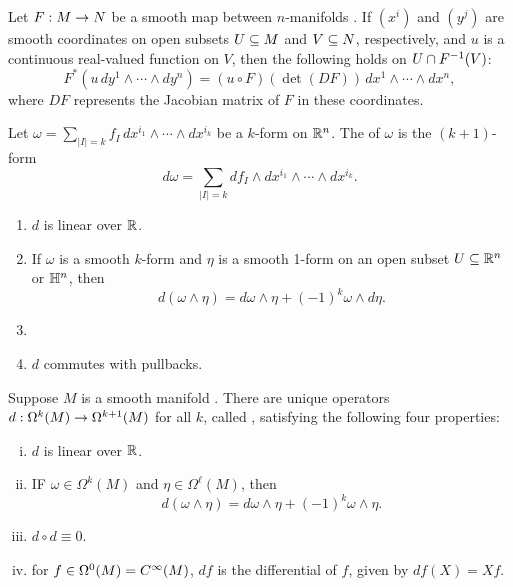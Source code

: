 \setcounter{thm}{19}

\begin{prop}
Let $F:M\rightarrow N$ be a smooth map between $n$-manifolds \wowob. If $(x^i)$ and $(y^j)$ are smooth coordinates on open subsets $U\subseteq M$ and $V\subseteq N$, respectively, and $u$ is a continuous real-valued function on $V$, then the following holds on $U\cap F^{-1}(V)$:
\[F^*(u\,dy^1\wedge\cdots\wedge dy^n) =(u\circ F)(\det(DF))\,dx^1\wedge\cdots\wedge dx^n,\]
where $DF$ represents the Jacobian matrix of $F$ in these coordinates.
\end{prop}

\dfn Let $\omega = \sum_{|I| = k} f_I\, dx^{i_1}\wedge\cdots\wedge dx^{i_k}$ be a $k$-form on $\mathbb{R}^n$. The  of $\omega$ is the $(k + 1)$-form
\[d\omega = \sum_{|I| = k} df_I\wedge dx^{i_1}\wedge\cdots\wedge dx^{i_k}.\]

\setcounter{thm}{22}

\begin{prop}\nl
\begin{enumerate}
    \item $d$ is linear over $\mathbb{R}$.
    \item If $\omega$ is a smooth $k$-form and $\eta$ is a smooth 1-form on an open subset $U\subseteq \mathbb{R}^n$ or $\mathbb{H}^n$, then
    \[d(\omega\wedge\eta) = d\omega\wedge\eta + (-1)^k\omega\wedge d\eta.\]
    \item {}
    \item $d$ commutes with pullbacks.
\end{enumerate}
\end{prop}

\begin{thm}
Suppose $M$ is a smooth manifold \wowob. There are unique operators $d:\Omega^k(M)\rightarrow \Omega^{k + 1}(M)$ for all $k$, called , satisfying the following four properties:
\begin{enumerate}[(i)]
    \item $d$ is linear over $\mathbb{R}$.
    \item IF $\omega\in\Omega^k(M)$ and $\eta \in \Omega^\ell(M)$, then
    \[d(\omega\wedge\eta) = d\omega\wedge\eta + (-1)^k\omega\wedge\eta.\]
    \item $d\circ d \equiv 0$.
    \item for $f\in \Omega^0(M) = C^\infty(M)$, $df$ is the differential of $f$, given by $df(X) = Xf$.
\end{enumerate}
\end{thm}

